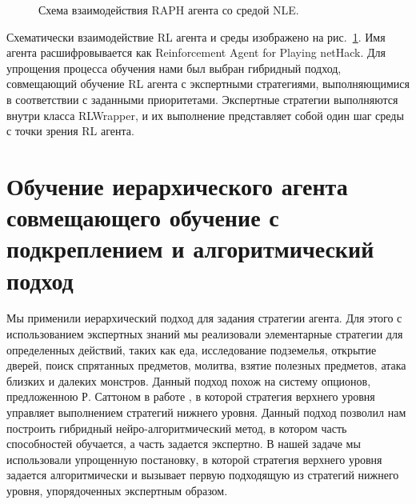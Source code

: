 \begin{figure}[ht]
\caption{Схема взаимодействия RAPH агента со средой NLE.}
    \label{fig:raph_nle}
\end{figure}

Схематически взаимодействие RL агента и среды изображено на рис.~\ref{fig:raph_nle}. Имя агента расшифровывается как Reinforcement Agent for Playing netHack. Для упрощения процесса обучения нами был выбран гибридный подход, совмещающий обучение RL агента с экспертными стратегиями, выполняющимися в соответствии с заданными приоритетами. Экспертные стратегии выполняются внутри класса RLWrapper, и их выполнение представляет собой один шаг среды с точки зрения RL агента. 

\section{Обучение иерархического агента совмещающего обучение с подкреплением и алгоритмический подход}

Мы применили иерархический подход для задания стратегии агента. Для этого с использованием экспертных знаний мы реализовали элементарные стратегии для определенных действий, таких как еда, исследование подземелья, открытие дверей, поиск спрятанных предметов, молитва, взятие полезных предметов, атака близких и далеких монстров. Данный подход похож на систему опционов, предложенною Р. Саттоном в работе \cite{Sutton1999}, в которой стратегия верхнего уровня управляет выполнением стратегий нижнего уровня. Данный подход позволил нам построить гибридный нейро-алгоритмический метод, в котором часть способностей обучается, а часть задается экспертно. В нашей задаче мы использовали упрощенную постановку, в которой стратегия верхнего уровня задается алгоритмически и вызывает первую подходящую из стратегий нижнего уровня, упорядоченных экспертным образом. 

